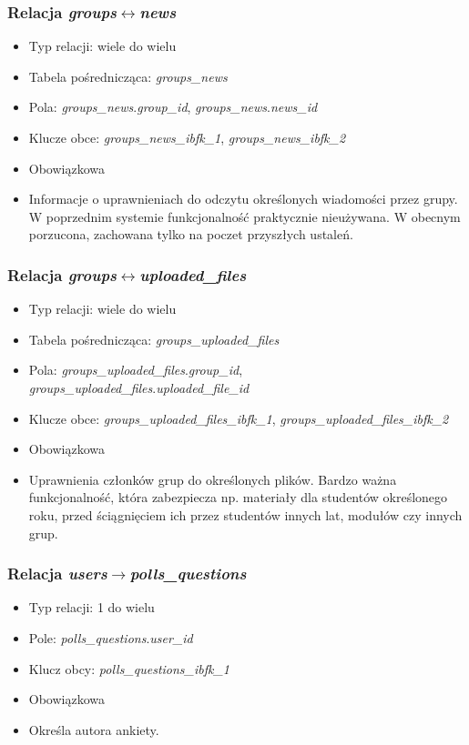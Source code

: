 \documentclass[a4paper,12pt,oneside]{report}
\begin{document}
\subsubsection{Relacja \emph{groups}$\leftrightarrow$\emph{news}}
\label{subsub:groups-news}
\begin{itemize}
  \item Typ relacji: wiele do wielu
  \item Tabela pośrednicząca: \emph{groups\_news}
  \item Pola: \emph{groups\_news}.\emph{group\_id}, \emph{groups\_news}.\emph{news\_id}
  \item Klucze obce: \emph{groups\_news\_ibfk\_1}, \emph{groups\_news\_ibfk\_2}
  \item Obowiązkowa
  \item Informacje o uprawnieniach do odczytu określonych wiadomości przez grupy. W poprzednim systemie funkcjonalność praktycznie nieużywana. W obecnym porzucona, zachowana tylko na poczet przyszłych ustaleń.
\end{itemize}

\subsubsection{Relacja \emph{groups}$\leftrightarrow$\emph{uploaded\_files}}
\label{subsub:groups-uploaded_files}
\begin{itemize}
  \item Typ relacji: wiele do wielu
  \item Tabela pośrednicząca: \emph{groups\_uploaded\_files}
  \item Pola: \emph{groups\_uploaded\_files}.\emph{group\_id}, \emph{groups\_uploaded\_files}.\emph{uploaded\_file\_id}
  \item Klucze obce: \emph{groups\_uploaded\_files\_ibfk\_1}, \emph{groups\_uploaded\_files\_ibfk\_2}
  \item Obowiązkowa
  \item Uprawnienia członków grup do określonych plików. Bardzo ważna funkcjonalność, która zabezpiecza np. materiały dla studentów określonego roku, przed ściągnięciem ich przez studentów innych lat, modułów czy innych grup.
\end{itemize}

\subsubsection{Relacja \emph{users}$\to$\emph{polls\_questions}}
\label{subsub:users-polls_questions}
\begin{itemize}
  \item Typ relacji: 1 do wielu
  \item Pole: \emph{polls\_questions}.\emph{user\_id}
  \item Klucz obcy: \emph{polls\_questions\_ibfk\_1}
  \item Obowiązkowa
  \item Określa autora ankiety.
\end{itemize}
\end{document}
